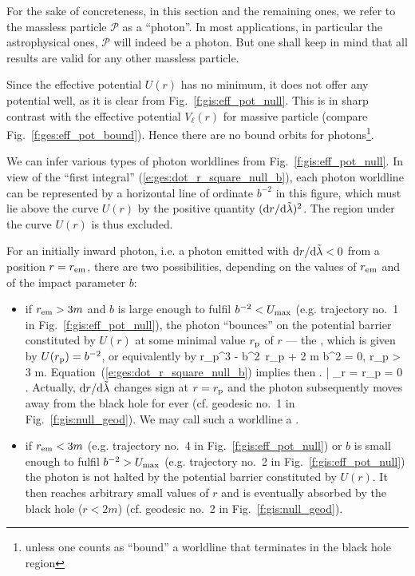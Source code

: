 For the sake of concreteness, in this section and the remaining ones, we
refer to the massless particle $\mathscr{P}$ as a ``photon''. In most applications, in
particular the astrophysical ones, $\mathscr{P}$ will indeed be a photon.
But one shall keep in mind that all results are valid for any other massless
particle.

Since the effective potential
$U(r)$ has no minimum, it does not offer any potential well,
as it is clear from Fig.~\ref{f:gis:eff_pot_null}. This is in sharp contrast
with the effective potential $V_\ell(r)$ for massive particle
(compare Fig.~\ref{f:ges:eff_pot_bound}). Hence there are no bound orbits
for photons\footnote{unless one counts as ``bound'' a worldline that terminates in the
black hole region}.

We can infer various types of photon worldlines from Fig.~\ref{f:gis:eff_pot_null}.
In view of the ``first integral'' (\ref{e:ges:dot_r_square_null_b}),
each photon worldline can be represented by a horizontal line of ordinate
$b^{-2}$ in this figure, which must lie above the curve $U(r)$
by the positive quantity $({\mathrm{d} r}/{\mathrm{d}\tilde{\lambda}})^2$. The region under the curve
$U(r)$ is thus excluded.

For an initially inward photon, i.e. a photon emitted with ${\mathrm{d} r}/{\mathrm{d}\tilde{\lambda}} < 0$
from a position $r=r_{\rm em}$, there are
two possibilities, depending on the values of $r_{\rm em}$ and
of the impact parameter $b$:
\begin{itemize}
\item if $r_{\rm em} > 3 m$ and $b$ is large enough to fulfil $b^{-2} < U_{\rm max}$
(e.g. trajectory no.~1 in Fig.~\ref{f:gis:eff_pot_null}), the photon
``bounces'' on the potential barrier constituted by $U(r)$
at some minimal value  $r_{\rm p}$ of $r$ --- the ,
which is given by  $U(r_{\rm p}) = b^{-2}$, or equivalently by
\be \label{e:ges:r_per_null}
  r_{\rm p}^3 - b^2\, r_{\rm p} + 2 m b^2 = 0, \quad r_{\rm p} > 3 m.
\ee
Equation~(\ref{e:ges:dot_r_square_null_b})
implies then
\be
    \left.  \right| _{r = r_{\rm p}} = 0 .
\ee
Actually, $\mathrm{d} r / \mathrm{d}\tilde{\lambda}$ changes sign at $r = r_{\rm p}$ and
the photon subsequently moves away from the black hole for ever (cf. geodesic
no.~1 in Fig.~\ref{f:gis:null_geod}). We may call
such a worldline a .
\item if $r_{\rm em} < 3 m$ (e.g. trajectory
no.~4 in Fig.~\ref{f:gis:eff_pot_null}) or $b$ is small enough to fulfil $b^{-2} > U_{\rm max}$ (e.g. trajectory
no.~2 in Fig.~\ref{f:gis:eff_pot_null}) the photon
is not halted by the potential barrier constituted by $U(r)$. It then reaches arbitrary
small values of $r$ and is eventually absorbed by the black hole ($r < 2m$)
(cf. geodesic no.~2 in Fig.~\ref{f:gis:null_geod}).
\end{itemize}

